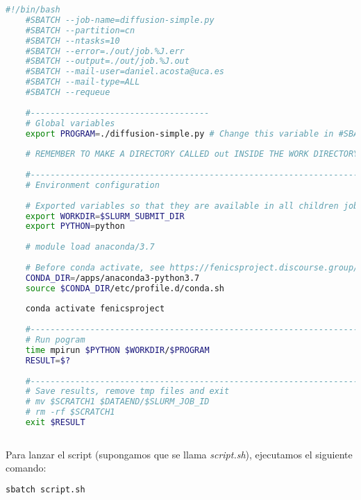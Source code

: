\begin{lstlisting}[language=sh]
	#!/bin/bash
	#SBATCH --job-name=diffusion-simple.py
	#SBATCH --partition=cn
	#SBATCH --ntasks=10
	#SBATCH --error=./out/job.%J.err
	#SBATCH --output=./out/job.%J.out
	#SBATCH --mail-user=daniel.acosta@uca.es
	#SBATCH --mail-type=ALL
	#SBATCH --requeue
	
	#------------------------------------
	# Global variables
	export PROGRAM=./diffusion-simple.py # Change this variable in #SBATCH --job-name too
	
	# REMEMBER TO MAKE A DIRECTORY CALLED out INSIDE THE WORK DIRECTORY TO SAVE THE OUTPUTS
	
	#------------------------------------------------------------------
	# Environment configuration
	
	# Exported variables so that they are available in all children jobs
	export WORKDIR=$SLURM_SUBMIT_DIR
	export PYTHON=python
	
	# module load anaconda/3.7
	
	# Before conda activate, see https://fenicsproject.discourse.group/t/fenics-from-conda-doesnt-import/3502/6
	CONDA_DIR=/apps/anaconda3-python3.7
	source $CONDA_DIR/etc/profile.d/conda.sh
	
	conda activate fenicsproject
	
	#------------------------------------------------------------------
	# Run pogram
	time mpirun $PYTHON $WORKDIR/$PROGRAM
	RESULT=$?
	
	#------------------------------------------------------------------
	# Save results, remove tmp files and exit
	# mv $SCRATCH1 $DATAEND/$SLURM_JOB_ID
	# rm -rf $SCRATCH1
	exit $RESULT
	
\end{lstlisting}

Para lanzar el script (supongamos que se llama \textit{script.sh}), ejecutamos el siguiente comando:
\begin{lstlisting}[language=sh]
	sbatch script.sh
\end{lstlisting}

